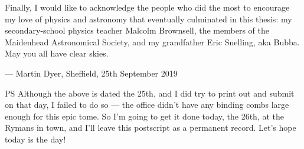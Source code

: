 \begin{onehalfspace}
\newpage

\medskip

Finally, I would like to acknowledge the people who did the most to encourage my love of physics and astronomy that eventually culminated in this thesis: my secondary-school physics teacher Malcolm Brownsell, the members of the Maidenhead Astronomical Society, and my grandfather Eric Snelling, aka Bubba. May you all have clear skies.

\smallskip

\begin{flushright}
--- Martin Dyer, Sheffield, 25th September 2019
\end{flushright}

\medskip

PS Although the above is dated the 25th, and I did try to print out and submit on that day, I failed to do so --- the office didn't have any binding combs large enough for this epic tome. So I'm going to get it done today, the 26th, at the Rymans in town, and I'll leave this postscript as a permanent record. Let's hope today is the day!

\end{onehalfspace}

